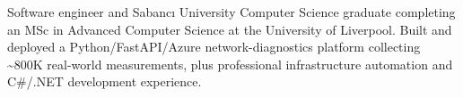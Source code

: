 
\newcommand{\cvprojects}{onepage_projects_backend}



Software engineer and Sabancı University Computer Science graduate completing an MSc in Advanced Computer Science at the University of Liverpool. Built and deployed a Python/FastAPI/Azure network-diagnostics platform collecting \textasciitilde 800K real-world measurements, plus professional infrastructure automation and C\#/.NET development experience.




